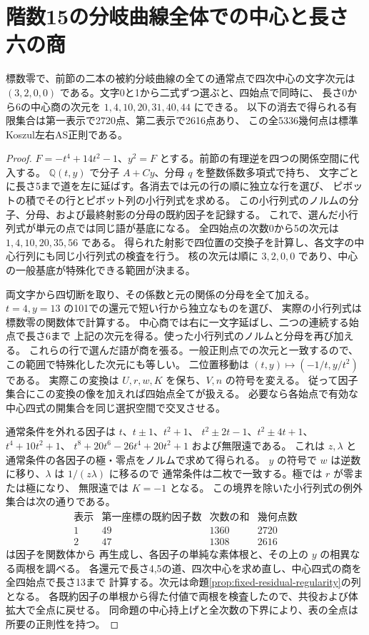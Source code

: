 \section{階数15の分岐曲線全体での中心と長さ六の商}
\label{sec:rank-fifteen-branch-center}
\begin{theorem}\label{thm:rank-fifteen-branch-center}
標数零で、前節の二本の被約分岐曲線の全ての通常点で四次中心の文字次元は
$(3,2,0,0)$ である。文字0と1から二式ずつ選ぶと、四始点で同時に、
長さ0から6の中心商の次元を $1,4,10,20,31,40,44$ にできる。
以下の消去で得られる有限集合は第一表示で2720点、第二表示で2616点あり、
この全5336幾何点は標準Koszul左右AS正則である。
\end{theorem}
\begin{proof}
$F=-t^4+14t^2-1$、$y^2=F$ とする。前節の有理逆を四つの関係空間に代入する。
$\mathbb Q(t,y)$ で分子 $A+Cy$、分母 $q$ を整数係数多項式で持ち、
文字ごとに長さ5まで道を左に延ばす。各消去では元の行の順に独立な行を選び、
ピボットの積でその行とピボット列の小行列式を求める。
この小行列式のノルムの分子、分母、および最終射影の分母の既約因子を記録する。
これで、選んだ小行列式が単元の点では同じ語が基底になる。
全四始点の次数0から5の次元は $1,4,10,20,35,56$ である。
得られた射影で四位置の交換子を計算し、各文字の中心行列にも同じ小行列式の検査を行う。
核の次元は順に $3,2,0,0$ であり、中心の一般基底が特殊化できる範囲が決まる。

両文字から四切断を取り、その係数と元の関係の分母を全て加える。
$t=4,y=13$ の101での還元で短い行から独立なものを選び、
実際の小行列式は標数零の関数体で計算する。
中心商では右に一文字延ばし、二つの連続する始点で長さ6まで
上記の次元を得る。使った小行列式のノルムと分母を再び加える。
これらの行で選んだ語が商を張る。一般正則点での次元と一致するので、
この範囲で特殊化した次元にも等しい。
二位置移動は $(t,y)\mapsto(-1/t,y/t^2)$ である。
実際この変換は $U,r,w,K$ を保ち、$V,n$ の符号を変える。
従って因子集合にこの変換の像を加えれば四始点全てが扱える。
必要なら各始点で有効な中心四式の開集合を同じ選択空間で交叉させる。

通常条件を外れる因子は $t$、$t\pm1$、$t^2+1$、
$t^2\pm2t-1$、$t^2\pm4t+1$、$t^4+10t^2+1$、
$t^8+20t^6-26t^4+20t^2+1$ および無限遠である。
これは $z,\lambda$ と通常条件の各因子の極・零点をノルムで求めて得られる。
$y$ の符号で $w$ は逆数に移り、$\lambda$ は $1/(z\lambda)$ に移るので
通常条件は二枚で一致する。極では $r$ が零または極になり、
無限遠では $K=-1$ となる。
この境界を除いた小行列式の例外集合は次の通りである。
\[
\begin{array}{c|r|r|r}
 \text{表示}&\text{第一座標の既約因子数}&\text{次数の和}&\text{幾何点数}\\ \hline
 1&49&1360&2720\\
 2&47&1308&2616
\end{array}
\]
 は因子を関数体から
再生成し、各因子の単純な素体根と、その上の $y$ の相異なる両根を調べる。
各還元で長さ4,5の道、四次中心を求め直し、中心四式の商を全四始点で長さ13まで
計算する。次元は命題\ref{prop:fixed-residual-regularity}の列となる。
各既約因子の単根から得た付値で両根を検査したので、共役および体拡大で全点に戻せる。
同命題の中心持上げと全次数の下界により、表の全点は所要の正則性を持つ。
\end{proof}

